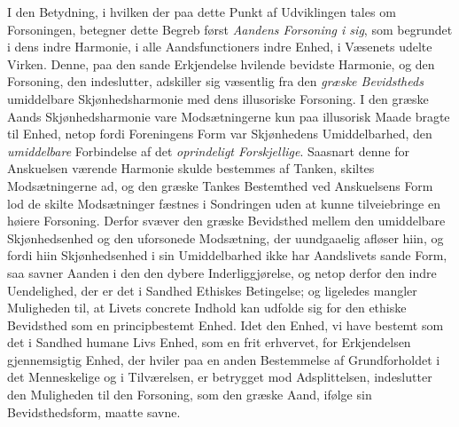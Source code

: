 I den Betydning, i hvilken der paa dette Punkt af Udviklingen tales om
Forsoningen, betegner dette Begreb først \emph{Aandens Forsoning i sig}, som
begrundet i dens indre Harmonie, i alle Aandsfunctioners indre Enhed, i Væsenets
udelte Virken. Denne, paa den sande Erkjendelse hvilende bevidste Harmonie, og den
Forsoning, den indeslutter, adskiller sig væsentlig fra den \emph{græske
Bevidstheds} umiddelbare Skjønhedsharmonie med dens illusoriske Forsoning. I den
græske Aands Skjønhedsharmonie vare Modsætningerne kun paa illusorisk Maade bragte
til Enhed, netop fordi Foreningens Form var Skjønhedens Umiddelbarhed, den
\emph{umiddelbare} Forbindelse af det \emph{oprindeligt Forskjellige}. Saasnart
denne for Anskuelsen værende Harmonie skulde bestemmes af Tanken, skiltes
Modsætningerne ad, og den græske Tankes Bestemthed ved Anskuelsens Form lod de
skilte Modsætninger fæstnes i Sondringen uden at kunne tilveiebringe en høiere
Forsoning. Derfor svæver den græske Bevidsthed mellem den umiddelbare
Skjønhedsenhed og den uforsonede Modsætning, der uundgaaelig afløser hiin, og fordi
hiin Skjønhedsenhed i sin Umiddelbarhed ikke har Aandslivets sande Form, saa savner
Aanden i den den dybere Inderliggjørelse, og netop derfor den indre Uendelighed,
der er det i Sandhed Ethiskes Betingelse; og ligeledes mangler Muligheden til, at
Livets concrete Indhold kan udfolde sig for den ethiske Bevidsthed som en
principbestemt Enhed. Idet den Enhed, vi have bestemt som det i Sandhed humane
Livs Enhed, som en frit erhvervet, for Erkjendelsen gjennemsigtig Enhed, der hviler
paa en anden Bestemmelse af Grundforholdet i det Menneskelige og i Tilværelsen, er
betrygget mod Adsplittelsen, indeslutter den Muligheden til den Forsoning, som den
græske Aand, ifølge sin Bevidsthedsform, maatte savne.


